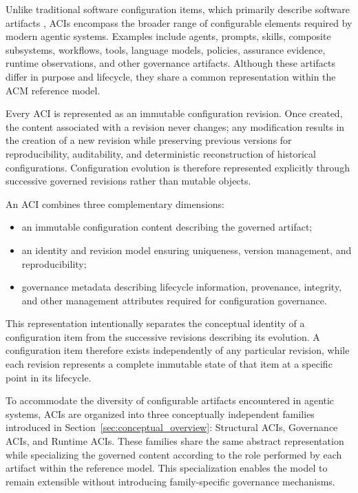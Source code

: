 \documentclass[10pt]{article}
\begin{document}
Unlike traditional software configuration items, which primarily describe software artifacts \cite{ref16}, ACIs encompass the broader range of configurable elements required by modern agentic systems. Examples include agents, prompts, skills, composite subsystems, workflows, tools, language models, policies, assurance evidence, runtime observations, and other governance artifacts. Although these artifacts differ in purpose and lifecycle, they share a common representation within the ACM reference model.

Every ACI is represented as an immutable configuration revision. Once created, the content associated with a revision never changes; any modification results in the creation of a new revision while preserving previous versions for reproducibility, auditability, and deterministic reconstruction of historical configurations. Configuration evolution is therefore represented explicitly through successive governed revisions rather than mutable objects.

An ACI combines three complementary dimensions:

\begin{itemize}

\item an immutable configuration content describing the governed artifact;

\item an identity and revision model ensuring uniqueness, version management, and reproducibility;

\item governance metadata describing lifecycle information, provenance, integrity, and other management attributes required for configuration governance.

\end{itemize}

This representation intentionally separates the conceptual identity of a configuration item from the successive revisions describing its evolution. A configuration item therefore exists independently of any particular revision, while each revision represents a complete immutable state of that item at a specific point in its lifecycle.

To accommodate the diversity of configurable artifacts encountered in agentic systems, ACIs are organized into three conceptually independent families introduced in Section~\ref{sec:conceptual_overview}: Structural ACIs, Governance ACIs, and Runtime ACIs. These families share the same abstract representation while specializing the governed content according to the role performed by each artifact within the reference model. This specialization enables the model to remain extensible without introducing family-specific governance mechanisms.
\end{document}
